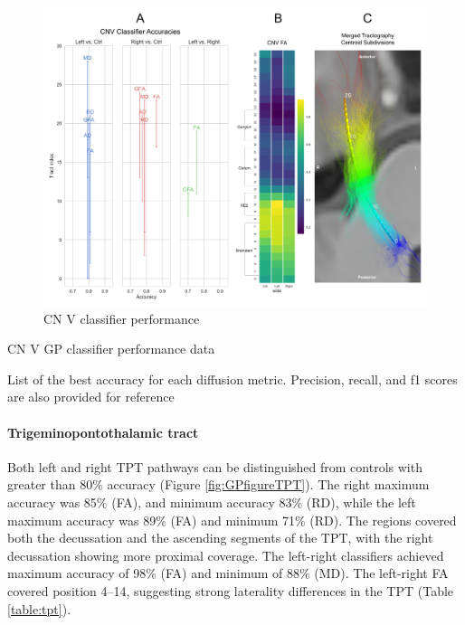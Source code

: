 \begin{figure}[ht]
\centering
\includegraphics[width=\linewidth]{figure-GP-CNV.pdf}
\caption{CN V classifier performance}
\label{fig:GPfigure4}
\end{figure}

\begin{table}[ht]
\centering
{}
\caption{CN V GP classifier performance data}
\caption*{List of the best accuracy for each diffusion metric. Precision, recall, and f1 scores are also provided for reference}
\label{table:CN V}
\end{table}

\paragraph{Trigeminopontothalamic tract}
Both left and right TPT pathways can be distinguished from controls with greater than 80\% accuracy (Figure \ref{fig:GPfigureTPT}). The right maximum accuracy was 85\% (FA), and minimum accuracy 83\% (RD), while the left maximum accuracy was 89\% (FA) and minimum 71\% (RD). The regions covered both the decussation and the ascending segments of the TPT, with the right decussation showing more proximal coverage. The left-right classifiers achieved maximum accuracy of 98\% (FA) and minimum of 88\% (MD). The left-right FA covered position 4--14, suggesting strong laterality differences in the TPT (Table \ref{table:tpt}). 

